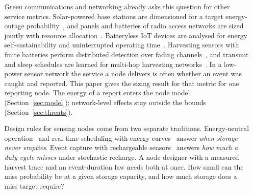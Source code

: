 Green communications and networking already asks this question for other service metrics. Solar-powered base stations are dimensioned for a target energy-outage probability~\cite{naderi2025tgcn}, and panels and batteries of radio access networks are sized jointly with resource allocation~\cite{chen2026tgcn}. Batteryless IoT devices are analysed for energy self-sustainability and uninterrupted operating time~\cite{fan2025tgcn}. Harvesting sensors with finite batteries perform distributed detection over fading channels~\cite{ardeshiri2023tgcn}, and transmit and sleep schedules are learned for multi-hop harvesting networks~\cite{dutta2025tgcn}. In a low-power sensor network the service a node delivers is often whether an event was caught and reported. This paper gives the sizing result for that metric for one reporting node. The energy of a report enters the node model (Section~\ref{sec:model}); network-level effects stay outside the bounds (Section~\ref{sec:threats}).

Design rules for sensing nodes come from two separate traditions. Energy-neutral operation~\cite{kansal2007,buchli2014sensys,ahn2023iotj} and real-time scheduling with energy curves~\cite{moser2007rts} answer \emph{when storage never empties}. Event capture with rechargeable sensors~\cite{kar2006ton,jaggi2009wn,ren2014tpds,yau2010tosn} answers \emph{how much a duty cycle misses} under stochastic recharge. A node designer with a measured harvest trace and an event-duration law needs both at once. How small can the miss probability be at a given storage capacity, and how much storage does a miss target require?

